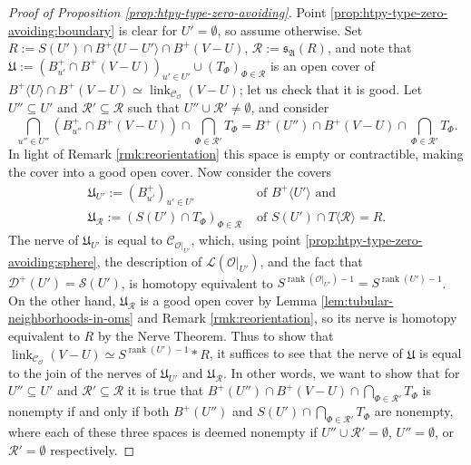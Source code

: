 \documentclass[a4paper,11pt,reqno, english]{amsart}
\theoremstyle{definition}
\theoremstyle{remark}
\DeclareMathOperator{\link}{\mathrm{link}}
\begin{document}
\begin{proof}[Proof of Proposition \ref{prop:htpy-type-zero-avoiding}]
    Point \ref{prop:htpy-type-zero-avoiding:boundary} is clear for $U'=\emptyset$, so assume otherwise. Set $R:=S(U')\cap B^+\langle U-U'\rangle\cap B^+(V-U)$, $\mathscr{R}:=\mathfrak{s}_\mathfrak{A}(R)$, and note that $\mathfrak{U}:=(B^+_{u'}\cap B^+(V-U))_{u'\in U'}\cup(T_\Phi)_{\Phi\in\mathscr{R}}$ is an open cover of $B^+\langle U\rangle\cap B^+(V-U)\simeq\link_{\mathscr{C}_\mathscr{O}}(V-U)$; let us check that it is good. Let $U''\subseteq U'$ and $\mathscr{R}'\subseteq \mathscr{R}$ such that $U''\cup\mathscr{R}'\neq\emptyset$, and consider
    \[
        \bigcap_{u''\in U''}(B^+_{u''}\cap B^+(V-U))\cap\bigcap_{\Phi\in\mathscr{R}'}T_\Phi
        =B^+(U'')\cap B^+(V-U)\cap\bigcap_{\Phi\in \mathscr{R}'}T_\Phi.
    \]
    In light of Remark \ref{rmk:reorientation} this space is empty or contractible, making the cover into a good open cover. Now consider the covers
    \begin{align*}
        \mathfrak{U}_{U'}:=(B^+_{u'})_{u'\in U'}&\text{~of~}B^+\langle U'\rangle\text{~and}\\
        \mathfrak{U}_{\mathscr{R}}:=(S(U')\cap T_\Phi)_{\Phi\in\mathscr{R}}&\text{~of~}S(U')\cap T\langle\mathscr{R}\rangle=R.
    \end{align*}
    The nerve of $\mathfrak{U}_{U'}$ is equal to $\mathscr{C}_{\mathscr{O}|_{U'}}$, which, using point \ref{prop:htpy-type-zero-avoiding:sphere}, the description of $\mathscr{L}(\mathscr{O}|_{U'})$, and the fact that $\mathscr{D}^+(U')=\mathscr{S}(U')$, is homotopy equivalent to $S^{\operatorname{rank}(\mathscr{O}|_{U'})-1}=S^{\operatorname{rank}(U')-1}$. On the other hand, $\mathfrak{U}_\mathscr{R}$ is a good open cover by Lemma \ref{lem:tubular-neighborhoods-in-oms} and Remark \ref{rmk:reorientation}, so its nerve is homotopy equivalent to $R$ by the Nerve Theorem. Thus to show that $\link_{\mathscr{C}_\mathscr{O}}(V-U)\simeq S^{\operatorname{rank}(U')-1}*R$, it suffices to see that the nerve of $\mathfrak{U}$ is equal to the join of the nerves of $\mathfrak{U}_{U'}$ and $\mathfrak{U}_\mathscr{R}$. In other words, we want to show that for $U''\subseteq U'$ and $\mathscr{R}'\subseteq \mathscr{R}$ it is true that $B^+(U'')\cap B^+(V-U)\cap\bigcap_{\Phi\in \mathscr{R}'}T_\Phi$ is nonempty if and only if both $B^+(U'')$ and $S(U')\cap\bigcap_{\Phi\in \mathscr{R}'}T_\Phi$ are nonempty, where each of these three spaces is deemed nonempty if $U''\cup\mathscr{R}'=\emptyset$, $U''=\emptyset$, or $\mathscr{R}'=\emptyset$ respectively.
    

\end{proof}
\end{document}
